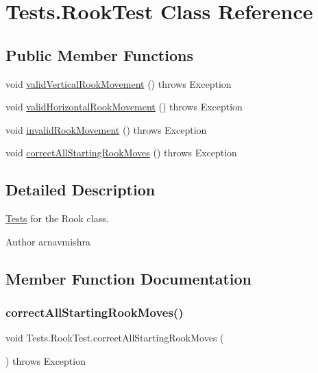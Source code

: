 \hypertarget{class_tests_1_1_rook_test}{}\section{Tests.\+Rook\+Test Class Reference}
\label{class_tests_1_1_rook_test}
\subsection*{Public Member Functions}
\begin{DoxyCompactItemize}
\item 
void \hyperlink{class_tests_1_1_rook_test_a3e0f7b9a6c9660eb2a75405197d261d8}{valid\+Vertical\+Rook\+Movement} ()  throws Exception 
\item 
void \hyperlink{class_tests_1_1_rook_test_a668f3fea9c6f61ff4ef09cb0da938810}{valid\+Horizontal\+Rook\+Movement} ()  throws Exception 
\item 
void \hyperlink{class_tests_1_1_rook_test_a3ecbdd2925b2497d7238d3d5057d527e}{invalid\+Rook\+Movement} ()  throws Exception 
\item 
void \hyperlink{class_tests_1_1_rook_test_a63ceffcd172cdbf213102234cddb8580}{correct\+All\+Starting\+Rook\+Moves} ()  throws Exception 
\end{DoxyCompactItemize}


\subsection{Detailed Description}
\hyperlink{namespace_tests}{Tests} for the Rook class. \begin{DoxyAuthor}{Author}
arnavmishra 
\end{DoxyAuthor}


\subsection{Member Function Documentation}
\hypertarget{class_tests_1_1_rook_test_a63ceffcd172cdbf213102234cddb8580}{}\label{class_tests_1_1_rook_test_a63ceffcd172cdbf213102234cddb8580} 
\subsubsection{\texorpdfstring{correct\+All\+Starting\+Rook\+Moves()}{correctAllStartingRookMoves()}}
{\footnotesize\ttfamily void Tests.\+Rook\+Test.\+correct\+All\+Starting\+Rook\+Moves (\begin{DoxyParamCaption}{ }\end{DoxyParamCaption}) throws Exception}

